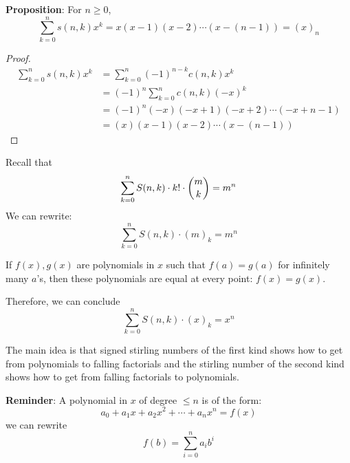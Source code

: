 \documentclass{report}
\begin{document}
\textbf{Proposition}: For $n \geq 0$,
    \begin{equation*}
        \sum_{k = 0}^{n} s(n, k)x^{k} = x(x - 1)(x - 2)\cdots (x - (n - 1)) = (x)_{n}
    \end{equation*}
        \begin{proof}
            \begin{align*}
                \sum_{k = 0}^{n} s(n, k)x^{k} &= \sum_{k = 0}^{n} (-1)^{n - k}c(n, k)x^{k} \\
                                              &= (-1)^{n}\sum_{k = 0}^{n} c(n, k)(-x)^{k} \\
                                              &= (-1)^{n}(-x)(-x + 1)(-x + 2) \cdots (-x + n - 1) \\
                                              &= (x)(x - 1)(x - 2)\cdots (x - (n - 1))
            \end{align*}
        \end{proof}

Recall that
    \begin{equation*}
        \sum_{k = 0}^{n} S(n, k) \cdot k! \cdot \dbinom{m}{k} = m^{n}
    \end{equation*}
We can rewrite:
    \begin{equation*}
        \sum_{k = 0}^{n} S(n, k)\cdot (m)_{k} = m^{n}
    \end{equation*}

\begin{theorem}{}
    If $f(x), g(x)$ are polynomials in $x$ such that $f(a) = g(a)$ for infinitely many $a$'s, then these polynomials are equal at every point: $f(x) = g(x)$.
\end{theorem}

Therefore, we can conclude
    \begin{equation*}
        \sum_{k = 0}^{n} S(n, k)\cdot (x)_{k} = x^{n}
    \end{equation*}

The main idea is that signed stirling numbers of the first kind shows how to get from polynomials to falling factorials and the stirling number of the second kind shows how to get from falling factorials to polynomials.

\textbf{Reminder}: A polynomial in $x$ of degree $\leq  n$ is of the form:
    \begin{equation*}
        a_{0} + a_{1}x + a_{2}x^{2} + \cdots  + a_{n}x^{n} = f(x)
    \end{equation*}
we can rewrite
    \begin{equation*}
        f(b) = \sum_{i = 0}^{n} a_{i}b^{i}
    \end{equation*}
\end{document}
